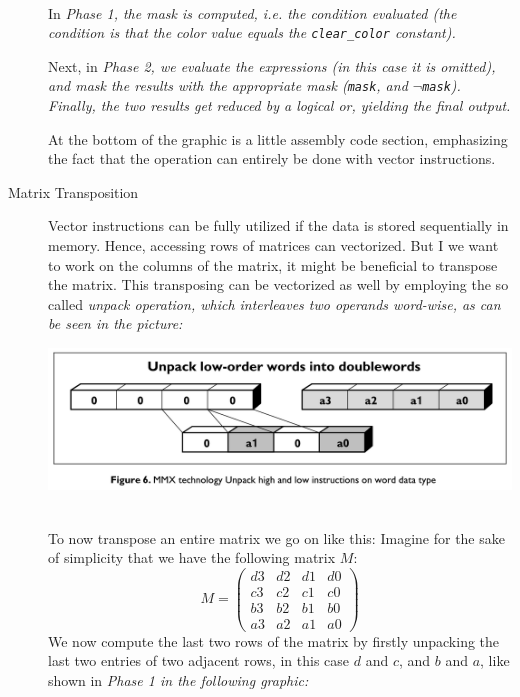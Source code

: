 \documentclass[../../main.tex]{subfiles}
\begin{document}
\begin{description}
    ~\\
    In \em Phase 1\em , the mask is computed, i.e. the condition evaluated (the condition is that the color value equals the \texttt{clear\_color} constant).

    Next, in \em Phase 2\em , we evaluate the expressions (in this case it is omitted), and mask the results with the appropriate mask (\texttt{mask}, and $\lnot$\texttt{mask}). Finally, the two results get reduced by a logical or, yielding the final output.

    At the bottom of the graphic is a little assembly code section, emphasizing the fact that the operation can entirely be done with vector instructions.

    \bigskip
    \item[Matrix Transposition] Vector instructions can be fully utilized if the data is stored sequentially in memory. Hence, accessing rows of matrices can vectorized. But I we want to work on the columns of the matrix, it might be beneficial to transpose the matrix. This transposing can be vectorized as well by employing the so called \em unpack \em operation, which interleaves two operands word-wise, as can be seen in the picture:

    \includegraphics[width=\textwidth]{chapters/07/unpack.png}

    ~\\
    To now transpose an entire matrix we go on like this: Imagine for the sake of simplicity that we have the following matrix $M$:
    \[ M = \begin{pmatrix}
        d3 & d2 & d1 & d0 \\
        c3 & c2 & c1 & c0 \\
        b3 & b2 & b1 & b0 \\
        a3 & a2 & a1 & a0
    \end{pmatrix}\]
    We now compute the last two rows of the matrix by firstly unpacking the last two entries of two adjacent rows, in this case $d$ and $c$, and $b$ and $a$, like shown in \em Phase 1 \em in the following graphic:


\end{description}
\end{document}
